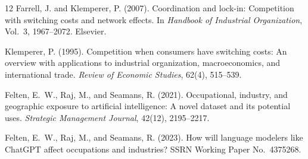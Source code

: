 \documentclass[12pt,a4paper]{article}
\begin{document}
\begin{thebibliography}{12}
Farrell, J. and Klemperer, P. (2007).
\newblock Coordination and lock-in: Competition with switching costs and network effects.
\newblock In \emph{Handbook of Industrial Organization}, Vol.~3, 1967--2072. Elsevier.

Klemperer, P. (1995).
\newblock Competition when consumers have switching costs: An overview with applications to industrial organization, macroeconomics, and international trade.
\newblock \emph{Review of Economic Studies}, 62(4), 515--539.

Felten, E.~W., Raj, M., and Seamans, R. (2021).
\newblock Occupational, industry, and geographic exposure to artificial intelligence: A novel dataset and its potential uses.
\newblock \emph{Strategic Management Journal}, 42(12), 2195--2217.

Felten, E.~W., Raj, M., and Seamans, R. (2023).
\newblock How will language modelers like ChatGPT affect occupations and industries?
\newblock SSRN Working Paper No.\ 4375268.

\end{thebibliography}
\end{document}

